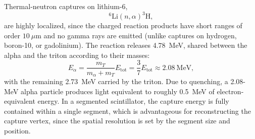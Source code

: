 \documentclass[tightenlines,
twocolumn,prl,notitlepage,nofootinbib,preprintnumbers,longbibliography]{revtex4-1}
\begin{document}
Thermal-neutron captures on lithium-6,
\[
^6\mathrm{Li}(n,\alpha)^3\mathrm{H},
\]
are highly localized, since the charged reaction products have short ranges of order $10~\mu\mathrm{m}$ and no gamma rays are emitted (unlike captures on hydrogen, boron-10, or gadolinium). The reaction releases 4.78~MeV, shared between the alpha and the triton according to their masses:
\[
E_\alpha = \frac{m_T}{m_\alpha + m_T} E_{\text{tot}} = \frac{3}{7} E_{\text{tot}} \approx 2.08~\text{MeV},
\]
with the remaining 2.73~MeV carried by the triton. Due to quenching, a 2.08-MeV alpha particle produces light equivalent to roughly 0.5~MeV of electron-equivalent energy. In a segmented scintillator, the capture energy is fully contained within a single segment, which is advantageous for reconstructing the capture vertex, since the spatial resolution is set by the segment size and position.
\end{document}
